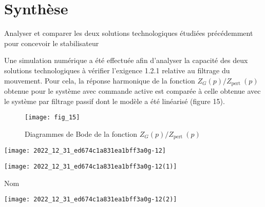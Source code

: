 \section{\label{part:5}Synthèse}
\begin{obj}
Analyser et comparer les deux solutions technologiques étudiées précédemment pour concevoir le stabilisateur
\end{obj}
Une simulation numérique a été effectuée afin d'analyser la capacité des deux solutions technologiques à vérifier l'exigence 1.2.1 relative au filtrage du mouvement. Pour cela, la réponse harmonique de la fonction $Z_{G}(p) / Z_{\text {pert }}(p)$ obtenue pour le système avec commande active est comparée à celle obtenue avec le système par filtrage passif dont le modèle a été linéarisé (figure 15).

\begin{figure}[H]
\centering
\texttt{[image: fig\_15]}
\caption{\label{fig:15}  Diagrammes de Bode de la fonction $Z_{G}(p) / Z_{\text {pert }}(p)$}
\end{figure}



\ifprof
\begin{corrige}
\end{corrige}
\else
\fi

\ifprof
\begin{corrige}
\end{corrige}
\else
\fi

\begin{center}
\texttt{[image: 2022\_12\_31\_ed674c1a831ea1bff3a0g-12]}
\end{center}



\begin{center}
\texttt{[image: 2022\_12\_31\_ed674c1a831ea1bff3a0g-12(1)]}
\end{center}

Nom

\begin{center}
\texttt{[image: 2022\_12\_31\_ed674c1a831ea1bff3a0g-12(2)]}
\end{center}




